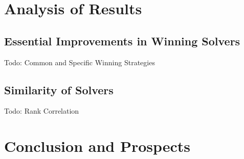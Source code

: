\documentclass{elsarticle}
\newcommand{\todo}[1]{{\color{purple}Todo: #1}}
\begin{document}
\section{Analysis of Results}
\label{sec:analysis}

\subsection{Essential Improvements in Winning Solvers}

\todo{Common and Specific Winning Strategies}

\subsection{Similarity of Solvers}

\todo{Rank Correlation}


\section{Conclusion and Prospects}
\label{sec:conclusion}





\end{document}
